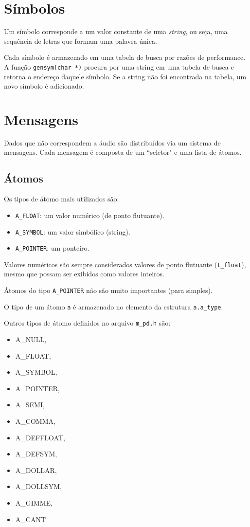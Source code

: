 \section{Símbolos}

Um símbolo corresponde a um valor constante de uma \emph{string}, ou seja,
uma sequência de letras que formam uma palavra única.

Cada símbolo é armazenado em uma tabela de busca por razões de performance. A
função \texttt{gensym(char *)} procura por uma string em uma tabela de busca e
retorna o endereço daquele símbolo. Se a string não foi encontrada na tabela,
um novo símbolo é adicionado.

\section{Mensagens}
\label{sec:mensagens}

Dados que não correspondem a áudio são distribuídos via um sistema de
mensagens. Cada mensagem é composta de um ``seletor" e uma lista de átomos.

\subsection{Átomos}
\label{sec:atomos}

Os tipos de átomo mais utilizados são:

\begin{itemize}
\item \texttt{A\_FLOAT}: um valor numérico (de ponto flutuante).
\item \texttt{A\_SYMBOL}: um valor simbólico (string).
\item \texttt{A\_POINTER}: um ponteiro.
\end{itemize}

Valores numéricos são sempre considerados valores de ponto flutuante
(\texttt{t\_float}), mesmo que possam ser exibidos como valores inteiros.

Átomos do tipo \texttt{A\_POINTER} não são muito importantes (para \externals
simples).

O tipo de um átomo \texttt{a} é armazenado no elemento da estrutura
\texttt{a.a\_type}.

Outros tipos de átomo definidos no arquivo \texttt{m\_pd.h} são:

\begin{itemize}
\item A\_NULL,
\item A\_FLOAT,
\item A\_SYMBOL,
\item A\_POINTER,
\item A\_SEMI,
\item A\_COMMA,
\item A\_DEFFLOAT,
\item A\_DEFSYM,
\item A\_DOLLAR, 
\item A\_DOLLSYM,
\item A\_GIMME,
\item A\_CANT
\end{itemize}

